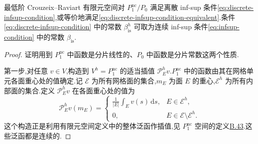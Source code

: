 \begin{theorem}\label{thm:crouzeix-raviart-infsup}
最低阶 Crouzeix--Raviart 有限元空间对 $P_1^{\mathrm{nc}}/P_0$ 满足离散 inf-sup 条件\cref{eq:discrete-infsup-condition},或等价地满足\cref{eq:discrete-infsup-condition-equivalent}.条件\cref{eq:discrete-infsup-condition} 中的常数 $\beta_{\mathrm{is}}^h$ 可取为连续 inf-sup 条件\cref{eq:infsup-condition} 中的常数 $\beta_{\mathrm{is}}$.
\end{theorem}

\begin{proof}
证明用到 $P_1^{\mathrm{nc}}$ 中函数是分片线性的、$P_0$ 中函数是分片常数这两个性质.

第一步,对任意 $v\in V$,构造到 $V^h=P_1^{\mathrm{nc}}$ 的适当插值 $\mathcal{P}_E^h v$.$P_1^{\mathrm{nc}}$ 中的函数由其在网格单元各面重心处的值确定.记 $\mathcal{E}$ 为所有网格面的集合,$m_E$ 为面 $E$ 的重心,$\mathcal{E}^h$ 为所有内部面的集合.定义 $\mathcal{P}_E^h v$ 在各面重心处的值为
\begin{equation}\label{eq:crouzeix-raviart-interpolant}
  \mathcal{P}_E^h v(m_E)=
  \begin{cases}
    \displaystyle\frac{1}{|E|}\int_E v(s)\,\mathrm{d}s,
       & E\in\mathcal{E}^h,\\[6pt]
    0, & E\in\mathcal{E}\setminus\mathcal{E}^h.
  \end{cases}
\end{equation}
这个构造正是利用有限元空间定义中的整体泛函作插值,见 $P_1^{\mathrm{nc}}$ 空间的定义\hyperref[ex:appendix-b-43]{B.43}.这些泛函都是连续的.


\end{proof}
